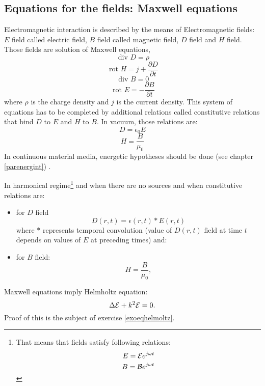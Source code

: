 \documentclass[12pt]{book}
\begin{document}
\subsection {Equations for the fields: Maxwell equations}
Electromagnetic interaction is described by the means of Electromagnetic
fields: $E$ field called electric field, $B$ field called magnetic field, $D$
field and $H$ field.
Those fields are solution of Maxwell equations,
\begin{equation}
\mbox{ div } D=\rho
\end{equation}
\begin{equation}
\mbox{ rot } H=j+\frac{\partial{D}}{\partial t}
\end{equation}
\begin{equation}
\mbox{ div } B=0
\end{equation}
\begin{equation}
\mbox{ rot } E=-\frac{\partial B}{\partial t}
\end{equation}
where  $\rho$ is the charge density and $j$ is the current density. This
system of equations has to be completed by additional relations called
constitutive relations that bind $D$ to $E$ and $H$ to $B$. 
In vacuum, those relations are:
\begin{equation}
D=\epsilon_0E
\end{equation}
\begin{equation}
H=\frac{B}{\mu_0}
\end{equation}
In continuous material media, energetic hypotheses should be done (see
chapter \ref{parenergint}) .
\begin{rem}
In harmonical regime\footnote{%
That means that fields satisfy following relations:
\begin{equation}
E={\cal E}e^{j\omega t}
\end{equation}
\begin{equation}
B={\cal B}e^{j\omega t}
\end{equation}
}%
and when there are no sources and when constitutive relations are:
\begin{itemize}
\item for $D$ field
\begin{equation}
D(r,t)=\epsilon(r,t) * E(r,t)
\end{equation}
where $*$ represents temporal convolution (value of
$D(r,t)$ field at time $t$ 
depends on values of $E$ at preceding times) and:
\item for $B$ field:
\begin{equation}
H=\frac{B}{\mu_0},
\end{equation}
\end{itemize}
Maxwell equations imply Helmholtz equation:
\begin{equation}
\Delta {\cal E}+k^2 {\cal E}=0.
\end{equation}
Proof of this is the subject of exercise
\ref{exoeqhelmoltz}.
\end{rem}
\end{document}
